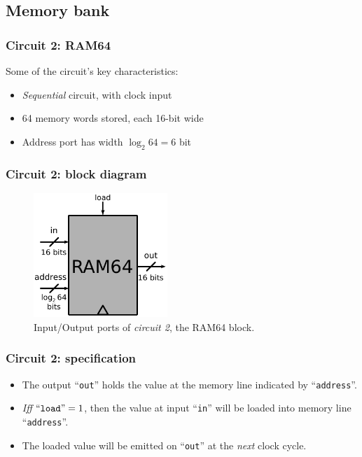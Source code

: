 \documentclass{beamer}
\begin{document}
        \subsection{Memory bank}
        \label{subsec:memory-bank}
            \begin{frame}
                \frametitle{Circuit 2: RAM64}

                \par{Some of the circuit's key characteristics:}

                \begin{itemize}
                    \item \emph{Sequential} circuit, with clock input
                    \item 64 memory words stored, each 16-bit wide
                    \item Address port has width $\log_{2} 64 = 6$ bit
                \end{itemize}
            \end{frame}

            \begin{frame}
                \frametitle{Circuit 2: block diagram}

                \begin{figure}[h!]
                    \centerline{\includegraphics[width=0.45\textwidth]{imgs/ram-block.pdf}}
                    \caption{Input/Output ports of \emph{circuit 2}, the RAM64 block.
                        \label{fig:ram-block}}
                \end{figure}
            \end{frame}

            \begin{frame}
                \frametitle{Circuit 2: specification}

                \begin{itemize}
                    \item The output ``\texttt{out}'' holds the value at the memory line indicated by ``\texttt{address}''.
                    \item \emph{Iff} $\text{``\texttt{load}''} = 1$,
                        then the value at input ``\texttt{in}'' will be loaded into memory line ``\texttt{address}''.
                    \item The loaded value will be emitted on ``\texttt{out}'' at the \emph{next} clock cycle.
                \end{itemize}
            \end{frame}
\end{document}
